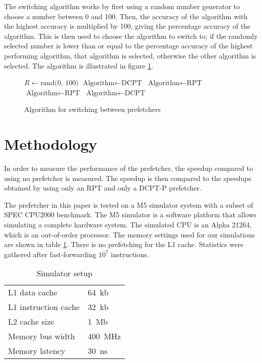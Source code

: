 \documentclass[journal,a4paper]{IEEEtran}
\begin{document}
The switching algorithm works by first using a random number generator to
choose a number between 0 and 100. Then, the accuracy of the algorithm with the
highest accuracy is multiplied by 100, giving the percentage accuracy of the
algorithm. This is then used to choose the algorithm to switch to; if the randomly
selected number is lower than or equal to the percentage accuracy of the highest
performing algorithm, that algorithm is selected, otherwise the other algorithm
is selected. The algorithm is illustrated in figure \ref{fig:switching}.

\begin{figure}[!h]
	\caption{Algorithm for switching between prefetchers}
	\label{fig:switching}
	\centering

	\begin{algorithmic}[1]
		\STATE $R \leftarrow \textrm{rand(0, 100)}$
				\STATE $\textrm{Algorithm} \leftarrow \textrm{DCPT}$
			\ELSE
				\STATE $\textrm{Algorithm} \leftarrow \textrm{RPT}$
			\ENDIF
				\STATE $\textrm{Algorithm} \leftarrow \textrm{RPT}$
			\ELSE
				\STATE $\textrm{Algorithm} \leftarrow \textrm{DCPT}$
			\ENDIF
		\ENDIF
	\end{algorithmic}
\end{figure}

\section{Methodology}
In order to measure the performance of the prefetcher, the speedup compared to
using no prefetcher is measured. The speedup is then compared to the speedups
obtained by using only an RPT and only a DCPT-P prefetcher.

The prefetcher in this paper is tested on a M5 simulator system with a subset of
SPEC CPU2000 benchmark. The M5 simulator is a software platform that allows
simulating a complete hardware system. The simulated CPU is an Alpha 21264, which
is an out-of-order processor. The memory settings used for our simulations are shown
in table \ref{tab:simsetup}. There is no prefetching for the L1 cache. Statistics
were gathered after fast-forwarding $10^7$ instructions.

\begin{table}[h]
	\caption{Simulator setup\cite{userman}}
	\label{tab:simsetup}
	\centering

	\begin{tabular}{|l|l|}
		\hline
		L1 data cache & 64~kb \\
		L1 instruction cache & 32~kb \\
		L2 cache size & 1~Mb \\
		Memory bus width & 400~MHz \\
		Memory latency & 30~ns \\
		\hline
	\end{tabular}
\end{table}
\end{document}
